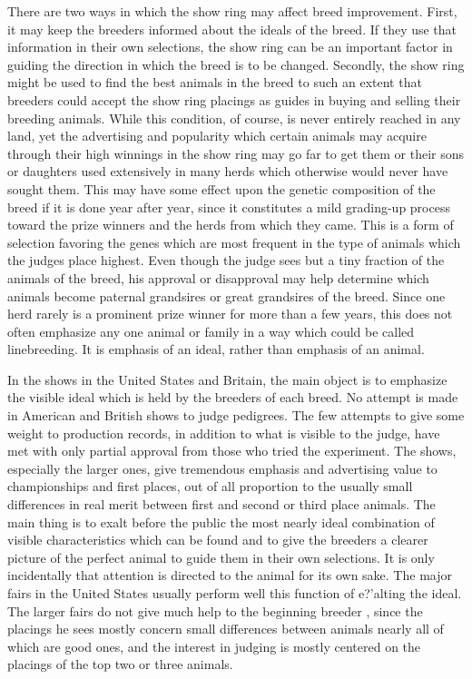There are two ways in which the show ring may affect breed
improvement. First, it may keep the breeders informed about the ideals
of the breed. If they use that information in their own selections, the
show ring can be an important factor in guiding the direction in which
the breed is to be changed. Secondly, the show ring might be used to
find the best animals in the breed to such an extent that breeders could
accept the show ring placings as guides in buying and selling their
breeding animals. While this condition, of course, is never entirely
reached in any land, yet the advertising and popularity which certain
animals may acquire through their high winnings in the show ring may
go far to get them or their sons or daughters used extensively in many
herds which otherwise would never have sought them. This may have
some effect upon the genetic composition of the breed if it is done year
after year, since it constitutes a mild grading-up process toward the
prize winners and the herds from which they came. This is a form of
selection favoring the genes which are most frequent in the type of animals
which the judges place highest. Even though the judge sees but a
tiny fraction of the animals of the breed, his approval or disapproval
may help determine which animals become paternal grandsires or great
grandsires of the breed. Since one herd rarely is a prominent prize winner
for more than a few years, this does not often emphasize any one
animal or family in a way which could be called linebreeding. It is
emphasis of an ideal, rather than emphasis of an animal.

In the shows in the United States and Britain, the main object is to
emphasize the visible ideal which is held by the breeders of each breed.
No attempt is made in American and British shows to judge pedigrees.
The few attempts to give some weight to production records, in addition
to what is visible to the judge, have met with only partial approval
from those who tried the experiment. The shows, especially the larger
ones, give tremendous emphasis and advertising value to championships
and first places, out of all proportion to the usually small differences
in real merit between first and second or third place animals. The
main thing is to exalt before the public the most nearly ideal combination
of visible characteristics which can be found and to give the breeders
a clearer picture of the perfect animal to guide them in their own
selections. It is only incidentally that attention is directed to the animal
for its own sake. The major fairs in the United States usually perform
well this function of e?'alting the ideal. The larger fairs do not give
much help to the beginning breeder , since the placings he sees mostly
concern small differences between animals nearly all of which are good
ones, and the interest in judging is mostly centered on the placings of
the top two or three animals.

